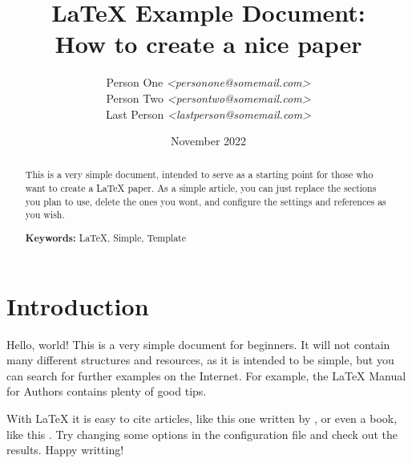 \documentclass[a4paper,12pt]{article}
\title{
    LaTeX Example Document: \\
    \large{How to create a nice paper} \\
}
\author{
     \small{Person One \textit{<personone@somemail.com>}} \\
     \small{Person Two \textit{<persontwo@somemail.com>}} \\
     \small{Last Person \textit{<lastperson@somemail.com>}} \\
}
\date{November 2022}
\begin{document}
\maketitle

\begin{abstract}
    This is a very simple document, intended to serve as a starting
    point for those who want to create a LaTeX paper. As a simple article,
    you can just replace the sections you plan to use, delete the
    ones you wont, and configure the settings and references as
    you wish.

    \vspace{1em}
    \noindent\textbf{Keywords:} LaTeX, Simple, Template
\end{abstract}

\section{Introduction}
Hello, world! This is a very simple document for beginners. It will not
contain many different structures and resources, as it is intended
to be simple, but you can search for further examples on the Internet. For example,
the LaTeX Manual for Authors \cite{LaTeX2020} contains plenty of good tips.

With LaTeX it is easy to cite articles, like this one written by \textcite{SomeAuthor2022},
or even a book, like this \cite{Genius1801}. Try changing some options in the configuration
file and check out the results. Happy writting!

\newpage
\printbibliography[heading=bibnumbered,title=References]
\end{document}
